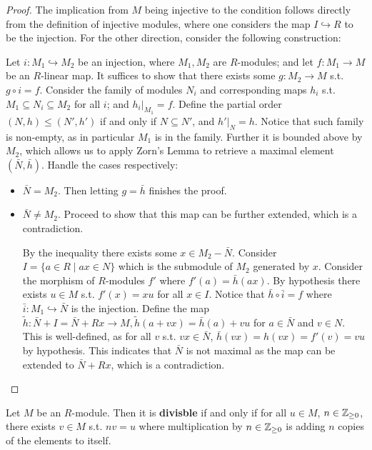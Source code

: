 \begin{proof}
    The implication from $M$ being injective to the condition follows directly from the definition of injective modules, where one considers the map $I \hookrightarrow R$ to be the injection. For the other direction, consider the following construction:

    Let $i: M_1 \hookrightarrow M_2$ be an injection, where $M_1, M_2$ are $R$-modules; and let $f: M_1 \to M$ be an $R$-linear map. It suffices to show that there exists some $g: M_2 \to M$ s.t. $g \circ i = f$. Consider the family of modules $N_i$ and corresponding maps $h_i$ s.t. $M_1 \subseteq N_i \subseteq M_2$ for all $i$; and $h_i|_{M_1} = f$. Define the partial order $(N, h) \leq (N', h')$ if and only if $N \subseteq N'$, and $h'|_N = h$. Notice that such family is non-empty, as in particular $M_1$ is in the family. Further it is bounded above by $M_2$, which allows us to apply Zorn's Lemma to retrieve a maximal element $(\bar{N}, \bar{h})$. Handle the cases respectively:
    \begin{itemize}
        \item $\bar{N} = M_2$. Then letting $g = \bar{h}$ finishes the proof.
        \item $\bar{N} \neq M_2$. Proceed to show that this map can be further extended, which is a contradiction.
        
        By the inequality there exists some $x \in M_2 - \bar{N}$. Consider $I = \{a \in R \mid ax \in N\}$ which is the submodule of $M_2$ generated by $x$. Consider the morphism of $R$-modules $f'$ where $f'(a) = \bar{h}(ax)$. By hypothesis there exists $u\in M$ s.t. $f'(x) = xu$ for all $x \in I$. Notice that $\bar{h} \circ \bar{i} = f$ where $\bar{i}: M_1 \hookrightarrow \bar{N}$ is the injection. Define the map $\tilde{h}: \bar{N} + I = \bar{N} + Rx \to M , \tilde{h}(a + vx) = \bar{h}(a) + vu$ for $a \in \bar{N}$ and $v\in N$. This is well-defined, as for all $v$ s.t. $vx \in \bar{N}$, $\bar{h}(vx) = h(vx) = f'(v) = vu$ by hypothesis. This indicates that $\bar{N}$ is not maximal as the map can be extended to $\bar{N} + Rx$, which is a contradiction.
    \end{itemize}
\end{proof}

\begin{definition}
    Let $M$ be an $R$-module. Then it is \textbf{divisble} if and only if for all $u \in M$, $n \in \mathbb{Z}_{\geq 0}$, there exists $v \in M$ s.t. $nv = u$ where multiplication by $n \in \mathbb{Z}_{\geq 0}$ is adding $n$ copies of the elements to itself.
\end{definition}

